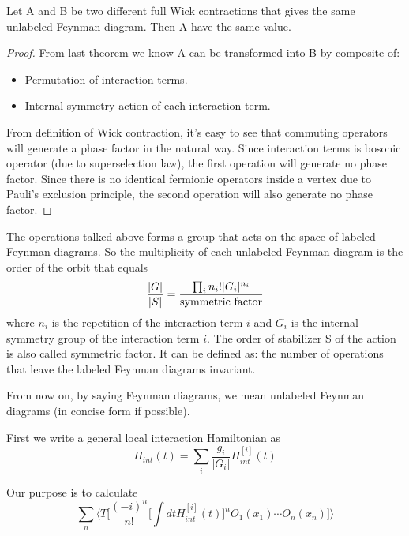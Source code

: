 \documentclass[12pt]{book}
\begin{document}
	\begin{theorem}
		Let A and B be two different full Wick contractions that gives the same unlabeled Feynman diagram. Then A have the same value.
	\end{theorem}
	\begin{proof}
		From last theorem we know A can be transformed into B by composite of:
		\begin{itemize}
			\item Permutation of interaction terms.
			\item Internal symmetry action of each interaction term.
		\end{itemize} 
		From definition of Wick contraction, it's easy to see that commuting operators will generate a phase factor in the natural way. Since interaction terms is bosonic operator (due to superselection law), the first operation will generate no phase factor. Since there is no identical fermionic operators inside a vertex due to Pauli's exclusion principle, the second operation will also generate no phase factor.
	\end{proof}
	
	The operations talked above forms a group that acts on the space of labeled Feynman diagrams. So the multiplicity of each unlabeled Feynman diagram is the order of the orbit that equals
	\begin{equation}
		\frac{|G|}{|S|}=\frac{\prod_i n_i!|G_i|^{n_i}}{\rm symmetric\ factor}
	\end{equation}
	where $n_i$ is the repetition of the interaction term $i$ and $G_i$ is the internal symmetry group of the interaction term $i$. The order of stabilizer S of the action is also called symmetric factor. It can be defined as: the number of operations that leave the labeled Feynman diagrams invariant.
	
	From now on, by saying Feynman diagrams, we mean unlabeled Feynman diagrams (in concise form if possible).
	
	First we write a general local interaction Hamiltonian as
	\begin{equation}
		H_{int}(t)=\sum_i \frac {g_i}{|G_i|} H_{int}^{[i]}(t)
	\end{equation}
	
	Our purpose is to calculate
	\begin{equation}
		\sum_n\Big \langle T\Big[\frac{(-i)^n}{n!}\Big[\int dt H_{int}^{[i]}(t)\Big]^nO_1(x_1)\cdots O_n(x_n)\Big] \Big \rangle \label{eqn:green_full}
	\end{equation} 
	
\end{document}
